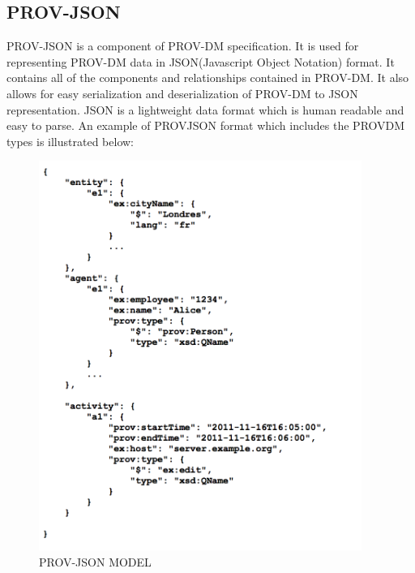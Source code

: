 
\subsection{PROV-JSON}

PROV-JSON is a component of PROV-DM specification. It is used for representing PROV-DM data in JSON(Javascript Object Notation) format. It contains all of the components and relationships contained in PROV-DM. It also allows for easy serialization and deserialization of PROV-DM to JSON representation. JSON is a lightweight data format which is human readable and easy to parse. An example of PROV\-JSON format which includes the PROV\-DM types is illustrated below:

\begin{figure}[h]
\begin{center}

\includegraphics[height=5in]{prov_json.png}
\end{center}
\caption{PROV-JSON MODEL}

\end{figure}



